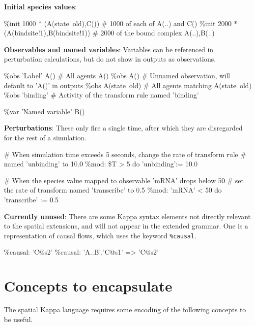 \textbf{Initial species values}:

\begin{kappasource}
\%init 1000 * (A(state~old),C())            # 1000 of each of A(..) and C()
\%init 2000 * (A(bindsite!1),B(bindsite!1)) # 2000 of the bound complex A(..),B(..)
\end{kappasource} 

\textbf{Observables and named variables}: Variables can be referenced in perturbation calculations, but do not show in outputs as observations.

\begin{kappasource}
\%obs 'Label' A()  # All agents A()
\%obs A()          # Unnamed observation, will default to 'A()' in outputs
\%obs A(state~old) # All agents matching A(state~old)
\%obs 'binding'    # Activity of the transform rule named 'binding'

\%var 'Named variable' B()
\end{kappasource} 

\textbf{Perturbations}: These only fire a single time, after which they are disregarded for the rest of a simulation.

\begin{kappasource}
# When simulation time exceeds 5 seconds, change the rate of transform rule
#   named 'unbinding' to 10.0
\%mod: \$T > 5 do ’unbinding’:= 10.0

# When the species value mapped to observable 'mRNA' drops below 50
#   set the rate of transform named 'transcribe' to 0.5
\%mod: 'mRNA' < 50 do 'transcribe' := 0.5
\end{kappasource} 

\textbf{Currently unused}: There are some Kappa syntax elements not directly relevant to the spatial extensions, and will not appear in the extended grammar. One is a representation of causal flows, which uses the keyword \verb|%causal|.

\begin{kappasource}
\%causal: ’C@s2’ 
\%causal: {’A..B’,’C@s1’} => ’C@s2’ 
\end{kappasource} 


\section{Concepts to encapsulate}

The spatial Kappa language requires some encoding of the following concepts to be useful.

